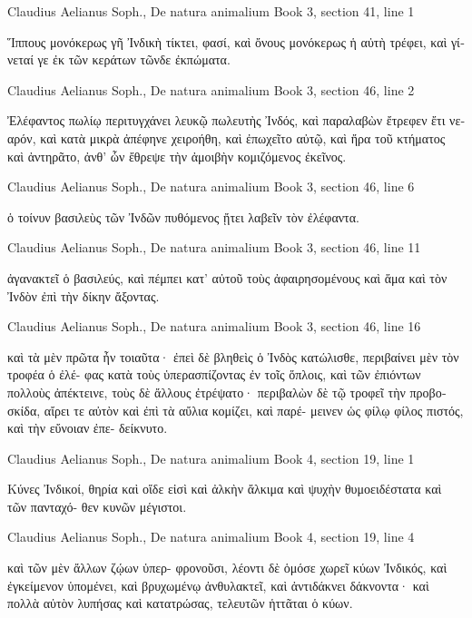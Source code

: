\documentclass[12pt,letterpaper,twoside,final]{memoir}
\begin{document}
\begin{greek}
Claudius Aelianus Soph., De natura animalium 
Book 3, section 41, line 1

Ἵππους μονόκερως γῆ Ἰνδικὴ τίκτει, φασί, καὶ 
ὄνους μονόκερως ἡ αὐτὴ τρέφει, καὶ γίνεταί γε ἐκ 
τῶν κεράτων τῶνδε ἐκπώματα. 



Claudius Aelianus Soph., De natura animalium 
Book 3, section 46, line 2

Ἐλέφαντος πωλίῳ περιτυγχάνει λευκῷ πωλευτὴς 
Ἰνδός, καὶ παραλαβὼν ἔτρεφεν ἔτι νεαρόν, καὶ κατὰ 
μικρὰ ἀπέφηνε χειροήθη, καὶ ἐπωχεῖτο αὐτῷ, καὶ 
ἤρα τοῦ κτήματος καὶ ἀντηρᾶτο, ἀνθ' ὧν ἔθρεψε τὴν 
ἀμοιβὴν κομιζόμενος ἐκεῖνος. 



Claudius Aelianus Soph., De natura animalium 
Book 3, section 46, line 6

                                  ὁ τοίνυν βασιλεὺς τῶν 
Ἰνδῶν πυθόμενος ᾔτει λαβεῖν τὸν ἐλέφαντα. 



Claudius Aelianus Soph., De natura animalium 
Book 3, section 46, line 11

       ἀγανακτεῖ ὁ βασιλεύς, καὶ πέμπει κατ' αὐτοῦ 
τοὺς ἀφαιρησομένους καὶ ἅμα καὶ τὸν Ἰνδὸν ἐπὶ τὴν 
δίκην ἄξοντας. 



Claudius Aelianus Soph., De natura animalium 
Book 3, section 46, line 16

καὶ τὰ μὲν πρῶτα ἦν τοιαῦτα· ἐπεὶ δὲ βληθεὶς ὁ 
Ἰνδὸς κατώλισθε, περιβαίνει μὲν τὸν τροφέα ὁ ἐλέ-
φας κατὰ τοὺς ὑπερασπίζοντας ἐν τοῖς ὅπλοις, καὶ 
τῶν ἐπιόντων πολλοὺς ἀπέκτεινε, τοὺς δὲ ἄλλους 
ἐτρέψατο· περιβαλὼν δὲ τῷ τροφεῖ τὴν προβοσκίδα, 
αἴρει τε αὐτὸν καὶ ἐπὶ τὰ αὔλια κομίζει, καὶ παρέ-
μεινεν ὡς φίλῳ φίλος πιστός, καὶ τὴν εὔνοιαν ἐπε-
δείκνυτο. 



Claudius Aelianus Soph., De natura animalium 
Book 4, section 19, line 1

Κύνες Ἰνδικοί, θηρία καὶ οἵδε εἰσὶ καὶ ἀλκὴν 
ἄλκιμα καὶ ψυχὴν θυμοειδέστατα καὶ τῶν πανταχό-
θεν κυνῶν μέγιστοι. 



Claudius Aelianus Soph., De natura animalium 
Book 4, section 19, line 4

                      καὶ τῶν μὲν ἄλλων ζῴων ὑπερ-
φρονοῦσι, λέοντι δὲ ὁμόσε χωρεῖ κύων Ἰνδικός, καὶ 
ἐγκείμενον ὑπομένει, καὶ βρυχωμένῳ ἀνθυλακτεῖ, 
καὶ ἀντιδάκνει δάκνοντα· καὶ πολλὰ αὐτὸν λυπήσας 
καὶ κατατρώσας, τελευτῶν ἡττᾶται ὁ κύων. 




\end{greek}
\end{document}
